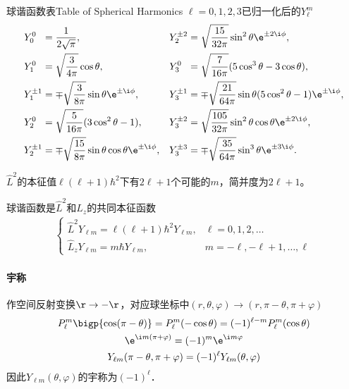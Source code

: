 \begin{example}{球谐函数表}{Table of Spherical Harmonics}
	$\ell=0,1,2,3$已归一化后的$Y_\ell^m$
	\begin{align*}
		Y_0^0~\;    & =\frac1{2\sqrt\pi},                                           & Y_2^{\pm 2} & =\sqrt{\frac{15}{32\pi}}\sin^2\theta\e^{\pm 2\i\phi},                 \\
		Y_1^0~\;    & =\sqrt{\frac3{4\pi}}\cos\theta,                               & Y_3^0~\;    & =\sqrt{\frac7{16\pi}}(5\cos^3\theta-3\cos\theta),                    \\
		Y_1^{\pm 1} & =\mp\sqrt{\frac3{8\pi}}\sin\theta\e^{\pm\i\phi},               & Y_3^{\pm 1} & =\mp\sqrt{\frac{21}{64\pi}}\sin\theta(5\cos^2\theta-1)\e^{\pm\i\phi}, \\
		Y_2^0~\;    & =\sqrt{\frac5{16\pi}}(3\cos^2\theta-1),                       & Y_3^{\pm 2} & =\sqrt{\frac{105}{32\pi}}\sin^2\theta\cos\theta\e^{\pm 2\i\phi},      \\
		Y_2^{\pm 1} & =\mp\sqrt{\frac{15}{8\pi}}\sin\theta\cos\theta\e^{\pm \i\phi}, & Y_3^{\pm 3} & =\mp\sqrt{\frac{35}{64\pi}}\sin^3\theta\e^{\pm 3\i\phi}.
	\end{align*}
\end{example}
$\hat L^2$的本征值$\ell(\ell+1)\hbar^2$下有$2\ell+1$个可能的$m$，简并度为$2\ell+1$。

球谐函数是$\hat L^2$和$\hat L_z$的共同本征函数
\begin{align*}
	\begin{cases}
		\hat L^2Y_{\ell m}=\ell(\ell+1)\hbar^2Y_{\ell m}, & \ell=0,1,2,\ldots           \\
		\hat L_zY_{\ell m}=m\hbar Y_{\ell m},             & m=-\ell,-\ell+1,\ldots,\ell
	\end{cases}
\end{align*}
\paragraph{宇称}作空间反射变换$\r\to-\r$，对应球坐标中$(r,\theta,\varphi)\to(r,\pi-\theta,\pi+\varphi)$
\begin{gather*}
	P_{\ell}^{m}\bigp{\cos (\pi-\theta)}=P_{\ell}^{m}(-\cos \theta)=(-1)^{\ell-m} P_{\ell}^{m}(\cos \theta) \\
	\e^{\i m(\pi+\varphi)}=(-1)^{m}\e^{\i m \varphi}                                                   \\
	Y_{\ell m}(\pi-\theta, \pi+\varphi)=(-1)^{\ell} Y_{\ell m}(\theta, \varphi)
\end{gather*}
因此$Y_{\ell m}(\theta,\varphi)$的宇称为$(-1)^\ell$．
